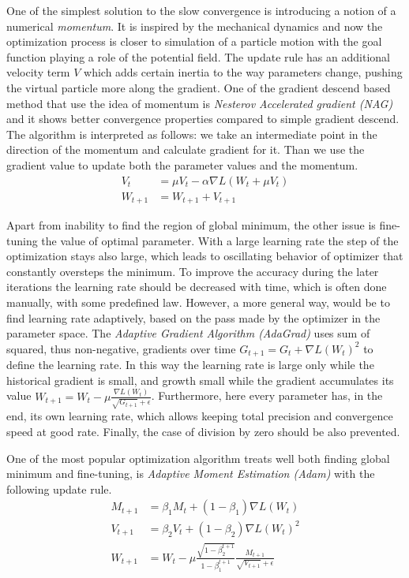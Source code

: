 One of the simplest solution to the slow convergence is introducing a notion of a numerical \textit{momentum}.
It is inspired by the mechanical dynamics and now the optimization process is closer to simulation of a particle motion with the goal function playing a role of the potential field.
The update rule has an additional velocity term $V$ which adds certain inertia to the way parameters change, pushing the virtual particle more along the gradient. 
One of the gradient descend based method that use the idea of momentum is \textit{Nesterov Accelerated gradient (NAG)} and it shows better convergence properties compared to simple gradient descend.
The algorithm is interpreted as follows: 
we take an intermediate point in the direction of the momentum and calculate gradient for it.
Than we use the gradient value to update both the parameter values and the momentum.
\begin{align*}
	V_{t} & =\mu V_{t} - \alpha \nabla L (W_{t}+\mu V_{t}) \\
	W_{t+1} & = W_{t+1} + V_{t+1}
\end{align*}

Apart from inability to find the region of global minimum, the other issue is fine-tuning the value of optimal parameter.
With a large learning rate the step of the optimization stays also large, which leads to oscillating behavior of optimizer that constantly oversteps the minimum.
To improve the accuracy during the later iterations the learning rate should be decreased with time, which is often done manually, with some predefined law. 
However, a more general way, would be to find learning rate adaptively, based on the pass made by the optimizer in the parameter space.
The \textit{Adaptive Gradient Algorithm (AdaGrad)} uses sum of squared, thus non-negative, gradients over time $G_{t+1} = G_{t}+\nabla L(W_{t})^2$ to define the learning rate.
In this way the learning rate is large only while the historical gradient is small, and growth small while the gradient accumulates its value $ W_{t+1} = W_{t} -\mu \frac{\nabla L(W_{t})}{\sqrt{G_{t+1}}+\epsilon} $.
Furthermore, here every parameter has, in the end, its own learning rate, which allows keeping total precision and convergence speed at good rate.
Finally, the case of division by zero should be also prevented. 
\medskip

One of the most popular optimization algorithm treats well both finding global minimum and fine-tuning, is \textit{Adaptive Moment Estimation (Adam)} with the following update rule.
\begin{align*}
	M_{t+1} & = \beta_{1}M_{t} + (1-\beta_{1})\nabla L(W_{t}) \\
	V_{t+1} & = \beta_{2} V_{t} + (1-\beta_{2})\nabla L(W_{t})^2 \\
	W_{t+1} & = W_{t} - \mu \frac{\sqrt{1-\beta_{2}^{t+1}}}{1-\beta_{1}^{t+1}} \frac{M_{t+1}}{\sqrt{V_{t+1}}+\epsilon}
\end{align*}		

